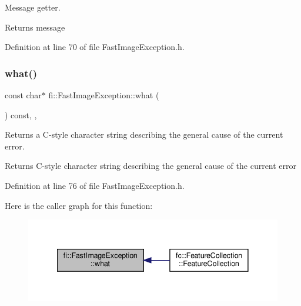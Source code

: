 Message getter. 

\begin{DoxyReturn}{Returns}
message 
\end{DoxyReturn}


Definition at line 70 of file Fast\+Image\+Exception.\+h.

\mbox{\label{classfi_1_1FastImageException_ac07476e6ffb78d5411865012d9527a93}} 
\subsubsection{\texorpdfstring{what()}{what()}}
{\footnotesize\ttfamily const char$\ast$ fi\+::\+Fast\+Image\+Exception\+::what (\begin{DoxyParamCaption}{ }\end{DoxyParamCaption}) const\hspace{0.3cm}{\ttfamily [inline]}, {\ttfamily [override]}, {\ttfamily [noexcept]}}



Returns a C-\/style character string describing the general cause of the current error. 

\begin{DoxyReturn}{Returns}
C-\/style character string describing the general cause of the current error 
\end{DoxyReturn}


Definition at line 76 of file Fast\+Image\+Exception.\+h.

Here is the caller graph for this function\+:
\nopagebreak
\begin{figure}[H]
\begin{center}
\leavevmode
\includegraphics[width=341pt]{d5/d1c/classfi_1_1FastImageException_ac07476e6ffb78d5411865012d9527a93_icgraph}
\end{center}
\end{figure}


